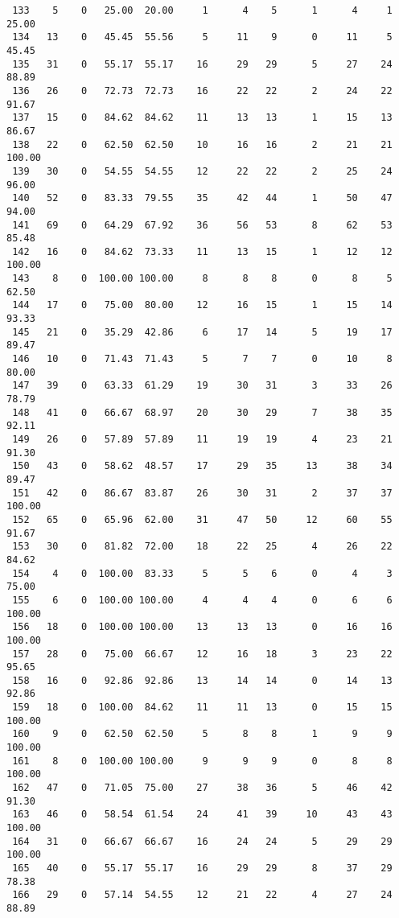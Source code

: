 \begin{verbatim}
 133    5    0   25.00  20.00     1      4    5      1      4     1    25.00
 134   13    0   45.45  55.56     5     11    9      0     11     5    45.45
 135   31    0   55.17  55.17    16     29   29      5     27    24    88.89
 136   26    0   72.73  72.73    16     22   22      2     24    22    91.67
 137   15    0   84.62  84.62    11     13   13      1     15    13    86.67
 138   22    0   62.50  62.50    10     16   16      2     21    21   100.00
 139   30    0   54.55  54.55    12     22   22      2     25    24    96.00
 140   52    0   83.33  79.55    35     42   44      1     50    47    94.00
 141   69    0   64.29  67.92    36     56   53      8     62    53    85.48
 142   16    0   84.62  73.33    11     13   15      1     12    12   100.00
 143    8    0  100.00 100.00     8      8    8      0      8     5    62.50
 144   17    0   75.00  80.00    12     16   15      1     15    14    93.33
 145   21    0   35.29  42.86     6     17   14      5     19    17    89.47
 146   10    0   71.43  71.43     5      7    7      0     10     8    80.00
 147   39    0   63.33  61.29    19     30   31      3     33    26    78.79
 148   41    0   66.67  68.97    20     30   29      7     38    35    92.11
 149   26    0   57.89  57.89    11     19   19      4     23    21    91.30
 150   43    0   58.62  48.57    17     29   35     13     38    34    89.47
 151   42    0   86.67  83.87    26     30   31      2     37    37   100.00
 152   65    0   65.96  62.00    31     47   50     12     60    55    91.67
 153   30    0   81.82  72.00    18     22   25      4     26    22    84.62
 154    4    0  100.00  83.33     5      5    6      0      4     3    75.00
 155    6    0  100.00 100.00     4      4    4      0      6     6   100.00
 156   18    0  100.00 100.00    13     13   13      0     16    16   100.00
 157   28    0   75.00  66.67    12     16   18      3     23    22    95.65
 158   16    0   92.86  92.86    13     14   14      0     14    13    92.86
 159   18    0  100.00  84.62    11     11   13      0     15    15   100.00
 160    9    0   62.50  62.50     5      8    8      1      9     9   100.00
 161    8    0  100.00 100.00     9      9    9      0      8     8   100.00
 162   47    0   71.05  75.00    27     38   36      5     46    42    91.30
 163   46    0   58.54  61.54    24     41   39     10     43    43   100.00
 164   31    0   66.67  66.67    16     24   24      5     29    29   100.00
 165   40    0   55.17  55.17    16     29   29      8     37    29    78.38
 166   29    0   57.14  54.55    12     21   22      4     27    24    88.89

\end{verbatim}
